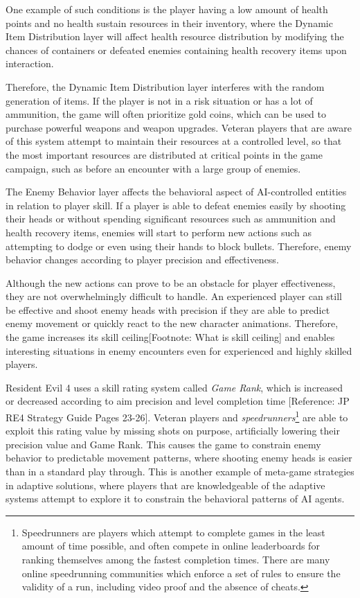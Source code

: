 One example of such conditions is the player having a low amount of health points and no health sustain resources in their inventory, where the Dynamic Item Distribution layer will affect health resource distribution by modifying the chances of containers or defeated enemies containing health recovery items upon interaction.

Therefore, the Dynamic Item Distribution layer interferes with the random generation of items. If the player is not in a risk situation or has a lot of ammunition, the game will often prioritize gold coins, which can be used to purchase powerful weapons and weapon upgrades.  Veteran players that are aware of this system attempt to maintain their resources at a controlled level, so that the most important resources are distributed at critical points in the game campaign, such as before an encounter with a large group of enemies.

The Enemy Behavior layer affects the behavioral aspect of AI-controlled entities in relation to player skill. If a player is able to defeat enemies easily by shooting their heads or without spending significant resources such as ammunition and health recovery items, enemies will start to perform new actions such as attempting to dodge or even using their hands to block bullets. Therefore, enemy behavior changes according to player precision and effectiveness.

Although the new actions can prove to be an obstacle for player effectiveness, they are not overwhelmingly difficult to handle. An experienced player can still be effective and shoot enemy heads with precision if they are able to predict enemy movement or quickly react to the new character animations. Therefore, the game increases its skill ceiling[Footnote: What is skill ceiling] and enables interesting situations in enemy encounters even for experienced and highly skilled players. 

Resident Evil 4 uses a skill rating system called \emph{Game Rank}, which is increased or decreased according to aim precision and level completion time [Reference: JP RE4 Strategy Guide Pages 23-26]. Veteran players and \emph{speedrunners}\footnote{Speedrunners are players which attempt to complete games in the least amount of time possible, and often compete in online leaderboards for ranking themselves among the fastest completion times. There are many online speedrunning communities which enforce a set of rules to ensure the validity of a run, including video proof and the absence of cheats.} are able to exploit this rating value by missing shots on purpose, artificially lowering their precision value and Game Rank. This causes the game to constrain enemy behavior to predictable movement patterns, where shooting enemy heads is easier than in a standard play through. This is another example of meta-game strategies in adaptive solutions, where players that are knowledgeable of the adaptive systems attempt to explore it to constrain the behavioral patterns of AI agents.

